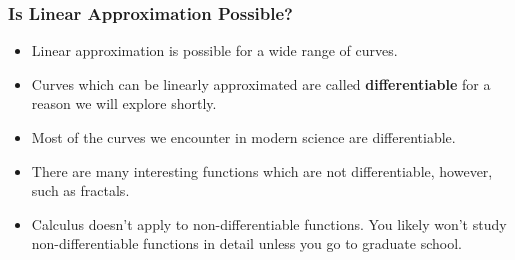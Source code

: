 \documentclass[serif,ignorenonframetext]{beamer}
\begin{document}
\begin{frame}
  \frametitle{Is Linear Approximation Possible?}

  \begin{itemize}
  \item Linear approximation is possible for a wide range of curves.
  \item Curves which can be linearly approximated are called
    \textbf{differentiable} for a reason we will explore shortly.
  \item Most of the curves we encounter in modern science are
    differentiable.
  \item There are many interesting functions which are not
    differentiable, however, such as fractals.
  \item Calculus doesn't apply to non-differentiable functions.  You
    likely won't study non-differentiable functions in detail unless
    you go to graduate school.
  \end{itemize}
\end{frame}
\end{document}
